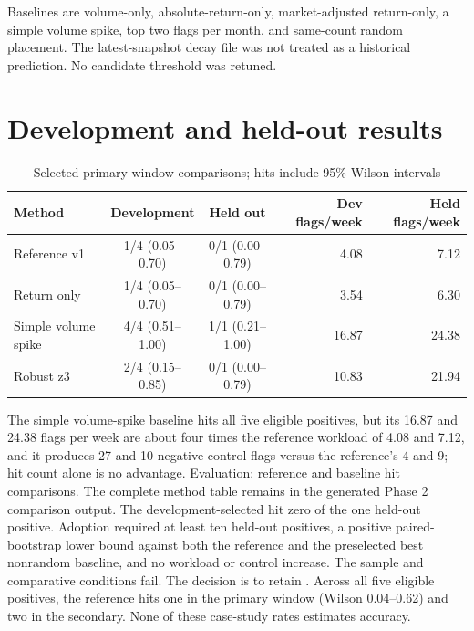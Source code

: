 Baselines are volume-only, absolute-return-only, market-adjusted
return-only, a simple volume spike, top two flags per month, and
same-count random placement. The latest-snapshot decay file was not
treated as a historical prediction. No candidate threshold was retuned.

\section{Development and held-out results}
\begin{table}[htbp]\centering\small
\caption{Selected primary-window comparisons; hits include 95\% Wilson intervals}
\begin{tabular}{@{}lccrr@{}}\toprule
Method & Development & Held out & Dev flags/week & Held flags/week\\\midrule
Reference v1 & 1/4 (0.05--0.70) & 0/1 (0.00--0.79) & 4.08 & 7.12\\
Return only & 1/4 (0.05--0.70) & 0/1 (0.00--0.79) & 3.54 & 6.30\\
Simple volume spike & 4/4 (0.51--1.00) & 1/1 (0.21--1.00) & 16.87 & 24.38\\
Robust z3 & 2/4 (0.15--0.85) & 0/1 (0.00--0.79) & 10.83 & 21.94\\
\bottomrule\end{tabular}
\end{table}
The simple volume-spike baseline hits all five eligible positives, but
its 16.87 and 24.38 flags per week are about four times the reference
workload of 4.08 and 7.12, and it produces 27 and 10 negative-control
flags versus the reference's 4 and 9; hit count alone is no advantage.
{Evaluation: reference and baseline hit comparisons.}
The complete method table remains in the generated Phase 2 comparison
output. The development-selected  hit zero of the one
held-out positive. Adoption required at least ten held-out positives,
a positive paired-bootstrap lower bound against both the reference and
the preselected best nonrandom baseline, and no workload or control
increase. The sample and comparative conditions fail. The decision is
to retain . Across all five eligible positives,
the reference hits one in the primary window (Wilson 0.04--0.62) and two
in the secondary. None of these case-study rates estimates accuracy.
